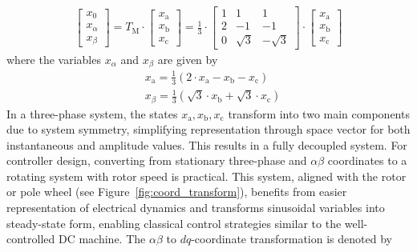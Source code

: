 \begin{equation}
    \begin{aligned}
        \left[\begin{array}{l}
        x_0 \\
        x_{\alpha} \\
        x_{\beta}
        \end{array}\right]=T_{\mathrm{M}} \cdot\left[\begin{array}{l}
        x_{\mathrm{a}} \\
        x_{\mathrm{b}} \\
        x_{\mathrm{c}}
        \end{array}\right]=\frac{1}{3} \cdot\left[\begin{array}{ccc}
        1 & 1 & 1 \\
        2 & -1 & -1 \\
        0 & \sqrt{3} & -\sqrt{3}
        \end{array}\right] \cdot\left[\begin{array}{l}
        x_{\mathrm{a}} \\
        x_{\mathrm{b}} \\
        x_{\mathrm{c}}
        \end{array}\right]
    \end{aligned}
\end{equation}
where the variables $x_\alpha$ and $x_\beta$ are given by
\begin{equation}
    \begin{aligned}
        & x_{\mathrm{a}}=\frac{1}{3}\left(2 \cdot x_{\mathrm{a}}-x_{\mathrm{b}}-x_{\mathrm{c}}\right) \\
        & x_\beta=\frac{1}{3}\left(\sqrt{3} \cdot x_{\mathrm{b}}+\sqrt{3} \cdot x_{\mathrm{c}}\right)
    \end{aligned}
\end{equation}
In a three-phase system, the states $x_{\mathrm{a}}, x_{\mathrm{b}}, x_{\mathrm{c}}$ transform into two main components due to system symmetry, simplifying representation through space vector for both instantaneous and amplitude values. This results in a fully decoupled system. For controller design, converting from stationary three-phase and $\alpha \beta$ coordinates to a rotating system with rotor speed is practical. This system, aligned with the rotor or pole wheel (see Figure~\cref{fig:coord_transform}), benefits from easier representation of electrical dynamics and transforms sinusoidal variables into steady-state form, enabling classical control strategies similar to the well-controlled DC machine. The $\alpha \beta$ to $dq$-coordinate transformation is denoted by

